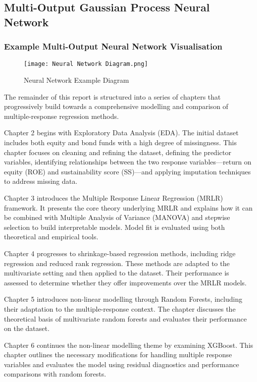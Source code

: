 \subsection{Multi-Output Gaussian Process Neural Network}
\subsubsection{Example Multi-Output Neural Network Visualisation}
\label{NN Visualisation}
\begin{figure}[H]
    \centering
    \texttt{[image: Neural Network Diagram.png]}
    \caption{Neural Network Example Diagram}
    \label{fig:NN e.g.}
\end{figure}


The remainder of this report is structured into a series of chapters that progressively build towards a comprehensive modelling and comparison of multiple-response regression methods.

Chapter 2 begins with Exploratory Data Analysis (EDA). The initial dataset includes both equity and bond funds with a high degree of missingness. This chapter focuses on cleaning and refining the dataset, defining the predictor variables, identifying relationships between the two response variables—return on equity (ROE) and sustainability score (SS)—and applying imputation techniques to address missing data.

Chapter 3 introduces the Multiple Response Linear Regression (MRLR) framework. It presents the core theory underlying MRLR and explains how it can be combined with Multiple Analysis of Variance (MANOVA) and stepwise selection to build interpretable models. Model fit is evaluated using both theoretical and empirical tools.

Chapter 4 progresses to shrinkage-based regression methods, including ridge regression and reduced rank regression. These methods are adapted to the multivariate setting and then applied to the dataset. Their performance is assessed to determine whether they offer improvements over the MRLR models.

Chapter 5 introduces non-linear modelling through Random Forests, including their adaptation to the multiple-response context. The chapter discusses the theoretical basis of multivariate random forests and evaluates their performance on the dataset.

Chapter 6 continues the non-linear modelling theme by examining XGBoost. This chapter outlines the necessary modifications for handling multiple response variables and evaluates the model using residual diagnostics and performance comparisons with random forests.

